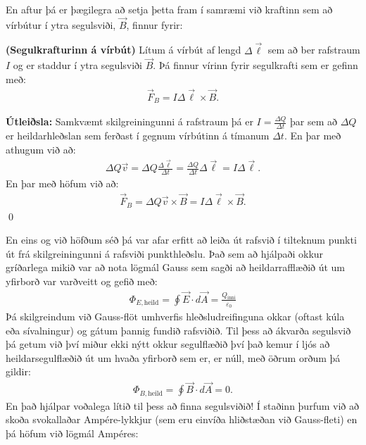 En aftur þá er þægilegra að setja þetta fram í samræmi við kraftinn sem að vírbútur í ytra segulsviði, $\vec{B}$, finnur fyrir:

\begin{tcolorbox}
\begin{theorem}
\textbf{(Segulkrafturinn á vírbút)} Lítum á vírbút af lengd $\Delta \vec{\ell}$ sem að ber rafstraum $I$ og er staddur í ytra segulsviði $\vec{B}$. Þá finnur vírinn fyrir segulkrafti sem er gefinn með:
\begin{align*}
    \vec{F}_B = I \Delta \vec{\ell} \times \vec{B}.
\end{align*}
\end{theorem}
\end{tcolorbox}

\textbf{Útleiðsla:} Samkvæmt skilgreiningunni á rafstraum þá er $I = \frac{\Delta Q}{\Delta t}$ þar sem að $\Delta Q$ er heildarhleðslan sem ferðast í gegnum vírbútinn á tímanum $\Delta t$. En þar með athugum við að:
\begin{align*}
    \Delta Q  \vec{v} = \Delta Q \frac{\Delta \vec{\ell}}{\Delta t} = \frac{\Delta Q}{\Delta t} \Delta \vec{\ell} = I \Delta \vec{\ell}.
\end{align*}
En þar með höfum við að:
\begin{align*}
    \vec{F}_B = \Delta Q \vec{v} \times \vec{B} = I \Delta \vec{\ell} \times \vec{B}.
\end{align*}
\qed

En eins og við höfðum séð þá var afar erfitt að leiða út rafsvið í tilteknum punkti út frá skilgreiningunni á rafsviði punkthleðslu. Það sem að hjálpaði okkur gríðarlega mikið var að nota lögmál Gauss sem sagði að heildarrafflæðið út um yfirborð var varðveitt og gefið með:
\begin{align*}
   \Phi_{E, \text{heild}} =  \oint \vec{E} \cdot d\vec{A} = \frac{Q_{\text{inni}}}{\varepsilon_0}
\end{align*}
Þá skilgreindum við Gauss-flöt umhverfis hleðsludreifinguna okkar (oftast kúla eða sívalningur) og gátum þannig fundið rafsviðið. Til þess að ákvarða segulsvið þá getum við því miður ekki nýtt okkur segulflæðið því það kemur í ljós að heildarsegulflæðið út um hvaða yfirborð sem er, er núll, með öðrum orðum þá gildir:
\begin{align*}
    \Phi_{B, \text{heild}} = \oint \vec{B} \cdot d\vec{A} = 0.
\end{align*}
En það hjálpar voðalega lítið til þess að finna segulsviðið! Í staðinn þurfum við að skoða svokallaðar Ampére-lykkjur (sem eru einvíða hliðstæðan við Gauss-fleti) en þá höfum við lögmál Ampéres:


